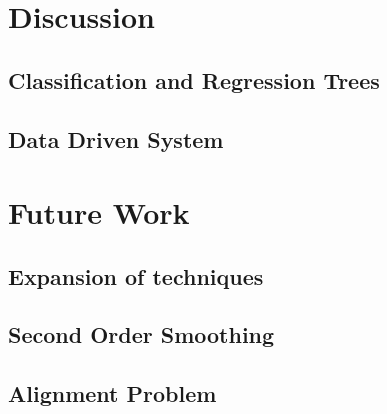 \documentclass[bsc,frontabs,twoside,singlespacing,parskip]{infthesis}
\begin{document}
\section{Discussion}
	\subsection{Classification and Regression Trees}
	\subsection{Data Driven System}
\section{Future Work}
	\subsection{Expansion of techniques}
	\subsection{Second Order Smoothing}
	\subsection{Alignment Problem}
	


\end{document}
